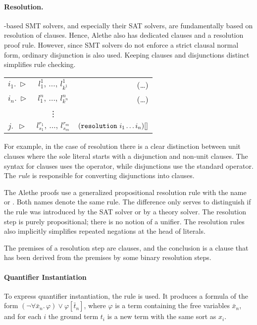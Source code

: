 \paragraph{Resolution.}
{\cdclt}-based SMT solvers, and especially their SAT solvers, are fundamentally based on resolution of clauses.
Hence, Alethe also has dedicated clauses and a resolution proof rule.
However, since SMT solvers do not enforce a strict clausal normal form, ordinary disjunction is also used.
Keeping clauses and disjunctions distinct simplifies rule checking.

\medskip

\begin{tabular}{l c r}
$i_1.~\triangleright$  & \qquad $l_1^1,\, \dots,\, l_{k^1}^1$ \qquad & (\dots)  \\
$i_n.~\triangleright$  & \qquad $l_1^n,\, \dots,\, l_{k^n}^n$ \qquad & (\dots) \\
  & \vdots  &  \\
$j.~~\triangleright$  & \qquad $l_{s_1}^{r_1},\, \dots,\, l_{s_m}^{r_m}$ \qquad & $(\texttt{\upshape{resolution}}~i_1 \dots i_n)[]$
\end{tabular}

\medskip


For example, in the case of resolution there is a clear distinction between unit clauses where the sole literal starts with a disjunction and non-unit clauses.
The syntax for clauses uses the  operator, while disjunctions use the standard  operator.
The  \emph{rule} is responsible for converting disjunctions into clauses.

The Alethe proofs use a generalized propositional resolution rule with the name  or .
Both names denote the same rule.
The difference only serves to distinguish if the rule was introduced by the SAT solver or by a theory solver.
The resolution step is purely propositional; there is no notion of a unifier.
The resolution rules also implicitly simplifies repeated negations at the head of literals.

The premises of a resolution step are clauses, and the conclusion is a clause that has been derived from the premises by some binary resolution steps.

\paragraph{Quantifier Instantiation}
To express quantifier instantiation, the rule 
is used. It produces a formula of the form $(\neg \forall \bar
x_n.\,\varphi) \lor \varphi[\bar t_n]$, where $\varphi$ is
a term containing the free variables $\bar x_n$, and for each $i$ the
ground term $t_i$ is a new term with the same sort as $x_i$.

